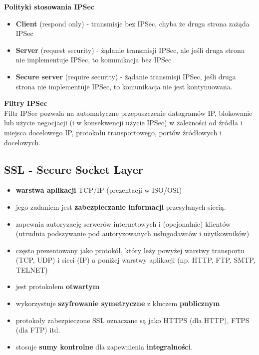 \documentclass[../main.tex]{subfiles}
\begin{document}
    \textbf{Polityki stosowania IPSec}
    \begin{itemize}
        \item \textbf{Client} (respond only) - transmisje bez IPSec, chyba że druga strona zażąda IPSec
        \item \textbf{Server} (request security) - żądanie transmisji IPSec, ale jeśli druga strona nie implementuje IPSec, to komunikacja bez IPSec
        \item \textbf{Secure server} (require security) - żądanie transmisji IPSec, jeśli druga strona nie implementuje IPSec, to komunikacja nie jest kontynuowana.
    \end{itemize}

    \textbf{Filtry IPSec}\\
    Filtr IPSec pozwala na automatyczne przepuszczenie datagramów IP, blokowanie lub użycie
    negocjacji (i w konsekwencji użycie IPSec) w zależności od źródła i miejsca docelowego IP,
    protokołu transportowego, portów źródłowych i docelowych.


    \subsection{SSL - Secure Socket Layer}
    \begin{itemize}
        \item \textbf{warstwa aplikacji} TCP/IP (prezentacji w ISO/OSI)
        \item jego zadaniem jest \textbf{zabezpieczanie informacji} przesyłanych siecią.
        \item zapewnia autoryzację serwerów internetowych i (opcjonalnie) klientów (utrudnia
        podszywanie pod autoryzowanych usługodawców i użytkowników)
        \item często prezentowany jako protokół, który leży
        powyżej warstwy transportu (TCP, UDP) i sieci (IP) a poniżej warstwy aplikacji (np. HTTP, FTP,
        SMTP, TELNET)
        \item jest protokołem \textbf{otwartym}
        \item wykorzystuje \textbf{szyfrowanie symetryczne} z kluczem \textbf{publicznym}
        \item protokoły zabezpieczone SSL oznaczane są jako HTTPS (dla HTTP), FTPS (dla FTP) itd.
        \item stosuje \textbf{sumy kontrolne} dla zapewnienia \textbf{integralności}.
    \end{itemize}
\end{document}
